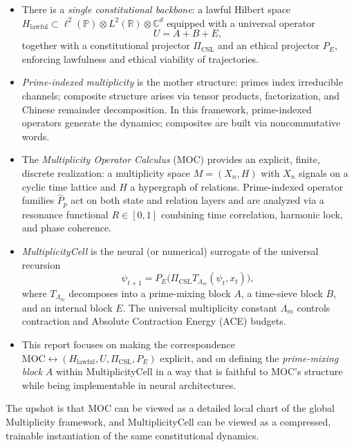 \documentclass[11pt]{article}
\begin{document}
\begin{itemize}[leftmargin=1.5em]
  \item There is a \emph{single constitutional backbone}: a lawful Hilbert
  space \(H_{\text{lawful}} \subset \ell^2(\mathbb{P}) \otimes L^2(\mathbb{R}) \otimes \mathbb{C}^d\)
  equipped with a universal operator
  \[
    U = A + B + E,
  \]
  together with a constitutional projector \(\Pi_{\text{CSL}}\) and an ethical
  projector \(P_E\), enforcing lawfulness and ethical viability of trajectories.

  \item \emph{Prime-indexed multiplicity} is the mother structure: primes
  index irreducible channels; composite structure arises via tensor products,
  factorization, and Chinese remainder decomposition. In this framework,
  prime-indexed operators generate the dynamics; composites are built via
  noncommutative words.

  \item The \emph{Multiplicity Operator Calculus} (MOC) \cite{MOC} provides an
  explicit, finite, discrete realization: a multiplicity space
  \(M = (X_n,H)\) with \(X_n\) signals on a cyclic time lattice and \(H\) a
  hypergraph of relations. Prime-indexed operator families
  \(\hat P_p\) act on both state and relation layers and are analyzed via a
  resonance functional \(R\in[0,1]\) combining time correlation, harmonic
  lock, and phase coherence. \cite{MOC}

  \item \emph{MultiplicityCell} is the neural (or numerical) surrogate of the
  universal recursion
  \[
    \psi_{t+1}
    =
    P_E\bigl(
      \Pi_{\text{CSL}}
      T_{\Lambda_m}(\psi_t, x_t)
    \bigr),
  \]
  where \(T_{\Lambda_m}\) decomposes into a prime-mixing block \(A\), a
  time-sieve block \(B\), and an internal block \(E\). The universal
  multiplicity constant \(\Lambda_m\) controls contraction and Absolute
  Contraction Energy (ACE) budgets.

  \item This report focuses on making the correspondence
  \(\text{MOC} \leftrightarrow (H_{\text{lawful}},U,\Pi_{\text{CSL}},P_E)\)
  explicit, and on defining the \emph{prime-mixing block} \(A\) within
  MultiplicityCell in a way that is faithful to MOC's structure while being
  implementable in neural architectures.
\end{itemize}

The upshot is that MOC can be viewed as a detailed local chart of the global
Multiplicity framework, and MultiplicityCell can be viewed as a compressed,
trainable instantiation of the same constitutional dynamics.
\end{document}

